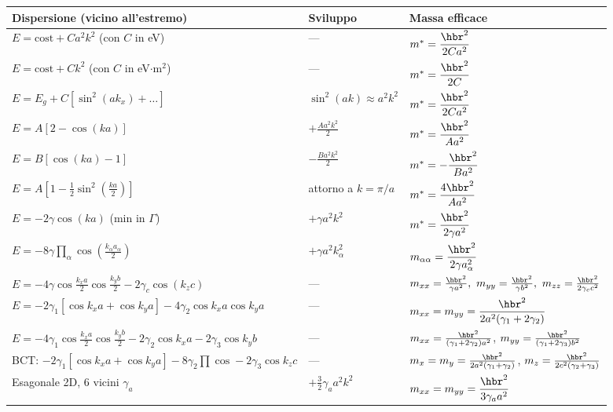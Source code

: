 \vspace{0.3cm}
\begin{center}
\renewcommand{\arraystretch}{1.7}
\begin{tabular}{l l l}
\toprule
Dispersione (vicino all'estremo) & Sviluppo & Massa efficace \\
\midrule
$E = \text{cost} + C a^2 k^2$ (con $C$ in eV) & --- & $m^*=\dfrac{\hbr^2}{2Ca^2}$ \\
$E = \text{cost} + C k^2$ (con $C$ in eV$\cdot$m$^2$) & --- & $m^*=\dfrac{\hbr^2}{2C}$ \\
$E = E_g + C\left[\sin^2(ak_x)+\dots\right]$ & $\sin^2(ak)\approx a^2k^2$ & $m^*=\dfrac{\hbr^2}{2Ca^2}$ \\
$E = A\left[2-\cos(ka)\right]$ & $+\frac{Aa^2k^2}{2}$ & $m^*=\dfrac{\hbr^2}{Aa^2}$ \\
$E = B\left[\cos(ka)-1\right]$ & $-\frac{Ba^2k^2}{2}$ & $m^*=-\dfrac{\hbr^2}{Ba^2}$ \\
$E = A\left[1-\frac12\sin^2\!\left(\frac{ka}{2}\right)\right]$ & attorno a $k=\pi/a$ & $m^*=\dfrac{4\hbr^2}{Aa^2}$ \\
$E = -2\gamma\cos(ka)$ (min in $\Gamma$) & $+\gamma a^2k^2$ & $m^*=\dfrac{\hbr^2}{2\gamma a^2}$ \\
$E = -8\gamma\prod_\alpha\cos\!\left(\frac{k_\alpha a_\alpha}{2}\right)$ & $+\gamma a^2k_\alpha^2$ & $m_{\alpha\alpha}=\dfrac{\hbr^2}{2\gamma a_\alpha^2}$ \\
$E=-4\gamma\cos\frac{k_xa}{2}\cos\frac{k_yb}{2}-2\gamma_c\cos(k_zc)$ & --- & $m_{xx}=\frac{\hbr^2}{\gamma a^2},\ m_{yy}=\frac{\hbr^2}{\gamma b^2},\ m_{zz}=\frac{\hbr^2}{2\gamma_cc^2}$ \\
$E=-2\gamma_1\!\left[\cos k_xa+\cos k_ya\right]-4\gamma_2\cos k_xa\cos k_ya$ & --- & $m_{xx}=m_{yy}=\dfrac{\hbr^2}{2a^2(\gamma_1+2\gamma_2)}$ \\
$E=-4\gamma_1\cos\frac{k_xa}{2}\cos\frac{k_yb}{2}-2\gamma_2\cos k_xa-2\gamma_3\cos k_yb$ & --- & $m_{xx}=\frac{\hbr^2}{(\gamma_1+2\gamma_2)a^2}$, $m_{yy}=\frac{\hbr^2}{(\gamma_1+2\gamma_3)b^2}$ \\
BCT: $-2\gamma_1[\cos k_xa+\cos k_ya]-8\gamma_2\prod\cos-2\gamma_3\cos k_zc$ & --- & $m_x=m_y=\frac{\hbr^2}{2a^2(\gamma_1+\gamma_2)}$, $m_z=\frac{\hbr^2}{2c^2(\gamma_2+\gamma_3)}$ \\
Esagonale 2D, 6 vicini $\gamma_a$ & $+\frac32\gamma_aa^2k^2$ & $m_{xx}=m_{yy}=\dfrac{\hbr^2}{3\gamma_aa^2}$ \\
\bottomrule
\end{tabular}
\end{center}


